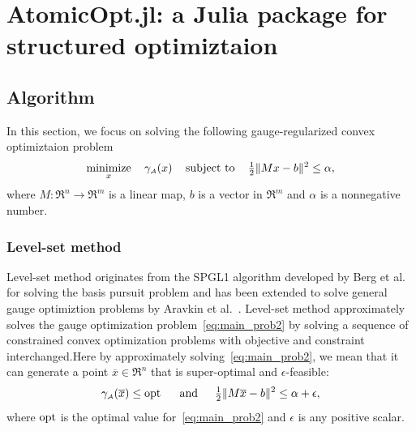 \chapter{AtomicOpt.jl: a Julia package for structured optimiztaion}
\label{ch:App-AtomicOpt}



\section{Algorithm}

In this section, we focus on solving the following gauge-regularized convex optimiztaion problem 
\begin{equation}\label{eq:main_prob2}
	\displaystyle\mathop{\hbox{\rm minimize}}_{x}\enspace \enspace \gamma_{\scriptscriptstyle\mathcal{A}}(x) \enspace\enspace\mathop{\hbox{\rm subject to}}\enspace\enspace {\textstyle{\frac{1}{2}}}\|Mx - b\|^2 \leq \alpha,
\end{equation}
where $M:\Re^n\to\Re^m$ is a linear map, $b$ is a vector in $\Re^m$ and $\alpha$ is a nonnegative number.

\subsection{Level-set method}
Level-set method originates from the SPGL1 algorithm developed by Berg et al.~\cite{berg2011sparse,berg2008probing} for solving the basis pursuit problem and has been extended to solve general gauge optimiztion problems by Aravkin et al.~\cite{aravkin2016levelset}. Level-set method approximately solves the gauge optimization problem~\eqref{eq:main_prob2} by solving a sequence of constrained convex optimization problems with objective and constraint interchanged.Here by approximately solving~\eqref{eq:main_prob2}, we mean that it can generate a point $\overline{x}\in\Re^n$ that is super-optimal and $\epsilon$-feasible:
\begin{equation} \label{eq:super-optimal}
  \gamma_{\scriptscriptstyle\mathcal{A}}(\overline{x}) \leq \operatorname{opt} \enspace\hbox{\quad and\quad}\enspace {\textstyle{\frac{1}{2}}}\|M\overline{x} - b\|^2 \leq \alpha + \epsilon,
\end{equation}
where $\operatorname{opt}$ is the optimal value for~\eqref{eq:main_prob2} and $\epsilon$ is any positive scalar.

